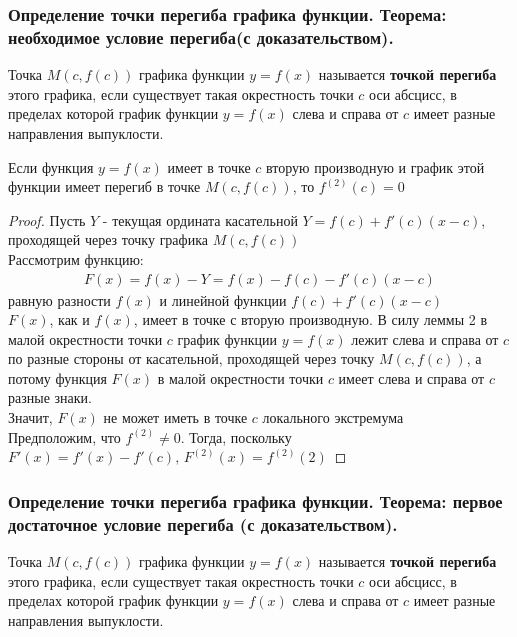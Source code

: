 \documentclass[10pt]{article}
\begin{document}
    \subsubsection{Определение точки перегиба графика функции. Теорема: необходимое условие перегиба(с доказательством).}
    \begin{definition}
        Точка $M(c, f(c))$ графика функции $y = f(x)$ называется \textbf{точкой перегиба} этого графика, если существует такая окрестность точки $c$ оси абсцисс, в пределах которой график функции $y = f(x)$ слева и справа от $c$ имеет разные направления выпуклости.
    \end{definition}
    \begin{theorem}
        Если функция $y = f(x)$ имеет в точке $c$ вторую производную и график этой функции имеет перегиб в точке $M(c, f(c))$, то $f^{(2)}(c) = 0$
    \end{theorem}
    \begin{proof}
        Пусть $Y$ - текущая ордината касательной $Y=f(c)+f'(c)(x-c)$, проходящей через точку графика $M(c, f(c))$\\
        Рассмотрим функцию:
        \begin{gather*}
            F(x)=f(x) - Y = f(x) - f(c) - f'(c)(x-c)
        \end{gather*}
        равную разности $f(x)$ и линейной функции $f(c)+f'(c)(x-c)$\\
        $F(x)$, как и $f(x)$, имеет в точке $с$ вторую производную. В силу леммы 2 в малой окрестности точки $c$ график функции $y = f(x)$ лежит слева и справа от $c$ по разные стороны от касательной, проходящей через точку $M(c, f(c))$, а потому функция $F(x)$ в малой окрестности точки $c$ имеет слева и справа от $c$ разные знаки.\\
        Значит, $F(x)$ не может иметь в точке $c$ локального экстремума\\
        Предположим, что $f^{(2)} \neq 0$. Тогда, поскольку $F'(x) = f'(x) - f'(c),\, F^{(2)}(x) = f^{(2)}(2)$
    \end{proof}



    \subsubsection{Определение точки перегиба графика функции. Теорема: первое достаточное условие перегиба (с доказательством).}
    \begin{definition}
        Точка $M(c, f(c))$ графика функции $y = f(x)$ называется \textbf{точкой перегиба} этого графика, если существует такая окрестность точки $c$ оси абсцисс, в пределах которой график функции $y = f(x)$ слева и справа от $c$ имеет разные направления выпуклости.
    \end{definition}
\end{document}
